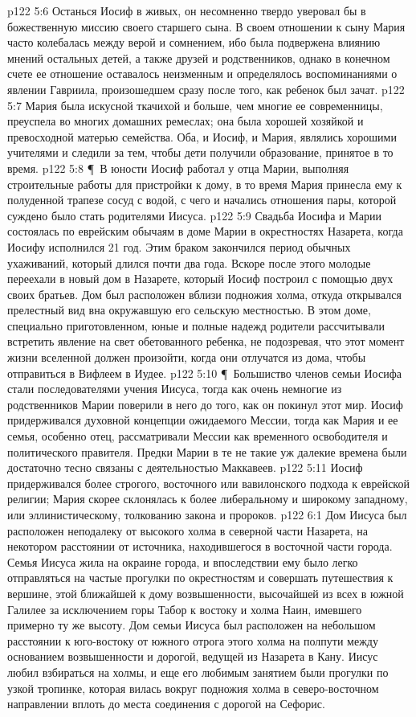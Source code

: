 \vs p122 5:6 Останься Иосиф в живых, он несомненно твердо уверовал бы в божественную миссию своего старшего сына. В своем отношении к сыну Мария часто колебалась между верой и сомнением, ибо была подвержена влиянию мнений остальных детей, а также друзей и родственников, однако в конечном счете ее отношение оставалось неизменным и определялось воспоминаниями о явлении Гавриила, произошедшем сразу после того, как ребенок был зачат.
\vs p122 5:7 Мария была искусной ткачихой и больше, чем многие ее современницы, преуспела во многих домашних ремеслах; она была хорошей хозяйкой и превосходной матерью семейства. Оба, и Иосиф, и Мария, являлись хорошими учителями и следили за тем, чтобы дети получили образование, принятое в то время.
\vs p122 5:8 \P\ В юности Иосиф работал у отца Марии, выполняя строительные работы для пристройки к дому, в то время Мария принесла ему к полуденной трапезе сосуд с водой, с чего и начались отношения пары, которой суждено было стать родителями Иисуса.
\vs p122 5:9 Свадьба Иосифа и Марии состоялась по еврейским обычаям в доме Марии в окрестностях Назарета, когда Иосифу исполнился 21 год. Этим браком закончился период обычных ухаживаний, который длился почти два года. Вскоре после этого молодые переехали в новый дом в Назарете, который Иосиф построил с помощью двух своих братьев. Дом был расположен вблизи подножия холма, откуда открывался прелестный вид вна окружавшую его сельскую местностью. В этом доме, специально приготовленном, юные и полные надежд родители рассчитывали встретить явление на свет обетованного ребенка, не подозревая, что этот момент жизни вселенной должен произойти, когда они отлучатся из дома, чтобы отправиться в Вифлеем в Иудее.
\vs p122 5:10 \P\ Большиство членов семьи Иосифа стали последователями учения Иисуса, тогда как очень немногие из родственников Марии поверили в него до того, как он покинул этот мир. Иосиф придерживался духовной концепции ожидаемого Мессии, тогда как Мария и ее семья, особенно отец, рассматривали Мессии как временного освободителя и политического правителя. Предки Марии в те не такие уж далекие времена были достаточно тесно связаны с деятельностью Маккавеев.
\vs p122 5:11 Иосиф придерживался более строгого, восточного или вавилонского подхода к еврейской религии; Мария скорее склонялась к более либеральному и широкому западному, или эллинистическому, толкованию закона и пророков.
\vs p122 6:1 Дом Иисуса был расположен неподалеку от высокого холма в северной части Назарета, на некотором расстоянии от источника, находившегося в восточной части города. Семья Иисуса жила на окраине города, и впоследствии ему было легко отправляться на частые прогулки по окрестностям и совершать путешествия к вершине, этой ближайшей к дому возвышенности, высочайшей из всех в южной Галилее за исключением горы Табор к востоку и холма Наин, имевшего примерно ту же высоту. Дом семьи Иисуса был расположен на небольшом расстоянии к юго\hyp{}востоку от южного отрога этого холма на полпути между основанием возвышенности и дорогой, ведущей из Назарета в Кану. Иисус любил взбираться на холмы, и еще его любимым занятием были прогулки по узкой тропинке, которая вилась вокруг подножия холма в северо\hyp{}восточном направлении вплоть до места соединения с дорогой на Сефорис.
